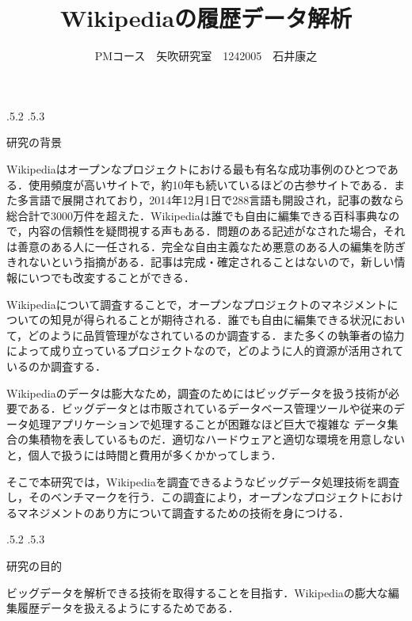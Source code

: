 \documentclass[uplatex]{jsarticle}
\title{\vspace{-14mm}Wikipediaの履歴データ解析}
\author{PMコース　矢吹研究室　1242005　石井康之}
\date{}%
\makeatletter
\renewcommand{\section}{%
    \if@slide\clearpage\fi
    \@startsection{section}{1}{\z@}%
    {\Cvs \@plus.5\Cdp \@minus.2\Cdp}%
    {.5\Cvs \@plus.3\Cdp}%
    {\normalfont\raggedright}}
\makeatother
\begin{document}
\maketitle





\section{研究の背景}

Wikipediaはオープンなプロジェクトにおける最も有名な成功事例のひとつである\cite{test1}．使用頻度が高いサイトで，約10年も続いているほどの古参サイトである．また多言語で展開されており，2014年12月1日で288言語も開設され，記事の数なら総合計で3000万件を超えた\cite{test107}．Wikipediaは誰でも自由に編集できる百科事典なので，内容の信頼性を疑問視する声もある．問題のある記述がなされた場合，それは善意のある人に一任される．完全な自由主義なため悪意のある人の編集を防ぎきれないという指摘がある．記事は完成・確定されることはないので，新しい情報にいつでも改変することができる．

Wikipediaについて調査することで，オープンなプロジェクトのマネジメントについての知見が得られることが期待される．誰でも自由に編集できる状況において，どのように品質管理がなされているのか調査する．また多くの執筆者の協力によって成り立っているプロジェクトなので，どのように人的資源が活用されているのか調査する．

Wikipediaのデータは膨大なため，調査のためにはビッグデータを扱う技術が必要である．ビッグデータとは市販されているデータベース管理ツールや従来のデータ処理アプリケーションで処理することが困難なほど巨大で複雑な データ集合の集積物を表しているものだ\cite{test106}．適切なハードウェアと適切な環境を用意しないと，個人で扱うには時間と費用が多くかかってしまう．

そこで本研究では，Wikipediaを調査できるようなビッグデータ処理技術を調査し，そのベンチマークを行う．この調査により，オープンなプロジェクトにおけるマネジメントのあり方について調査するための技術を身につける．





\section{研究の目的}

ビッグデータを解析できる技術を取得することを目指す．Wikipediaの膨大な編集履歴データを扱えるようにするためである．
\end{document}
